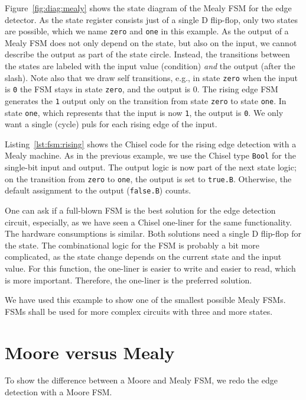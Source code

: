 \documentclass[%
    10pt,
    headinclude, footexclude,
    openright, %
    notitlepage,
    cleardoubleempty,
    headsepline,
    pointlessnumbers,
    bibtotoc, idxtotoc,
    ]{scrbook}
\newcommand{\code}[1]{{\small{\texttt{#1}}}}
\begin{document}
Figure~\ref{fig:diag:mealy} shows the state diagram of the Mealy FSM for the
edge detector. As the state register consists just of a single D flip-flop,
only two states are possible, which we name \code{zero} and \code{one} in this
example.
As the output of a Mealy FSM does not only depend on the state, but also
on the input, we cannot describe the output as part of the state circle.
Instead, the transitions between the states are labeled with the input
value (condition) \emph{and} the output (after the slash).
Note also that we draw self transitions, e.g., in state \code{zero} when
the input is \code{0} the FSM stays in state \code{zero}, and the output is {0}.
The rising edge FSM generates the \code{1} output only on the transition
from state \code{zero} to state \code{one}. In state \code{one}, which represents
that the input is now \code{1}, the output is \code{0}. We only want a single (cycle)
puls for each rising edge of the input.


Listing~\ref{lst:fsm:rising} shows the Chisel code for the rising edge detection
with a Mealy machine.
As in the previous example, we use the Chisel type \code{Bool} for the
single-bit input and output.
The output logic is now part of the next state logic; on the transition from
\code{zero} to \code{one}, the output is set to \code{true.B}. Otherwise,
the default assignment to the output (\code{false.B}) counts.

One can ask if a full-blown FSM is the best solution for the edge detection circuit,
especially, as we have seen a Chisel one-liner for the same functionality.
The hardware consumptions is similar. Both solutions need a single D flip-flop
for the state. The combinational logic for the FSM is probably a bit more complicated, as
the state change depends on the current state and the input value.
For this function, the one-liner is easier to write and easier to read,
which is more important. Therefore, the one-liner is the preferred solution.

We have used this example to show one of the smallest possible Mealy FSMs.
FSMs shall be used for more complex circuits with three and more states.

\section{Moore versus Mealy}

To show the difference between a Moore and Mealy FSM, we redo the edge
detection with a Moore FSM. 
\end{document}
